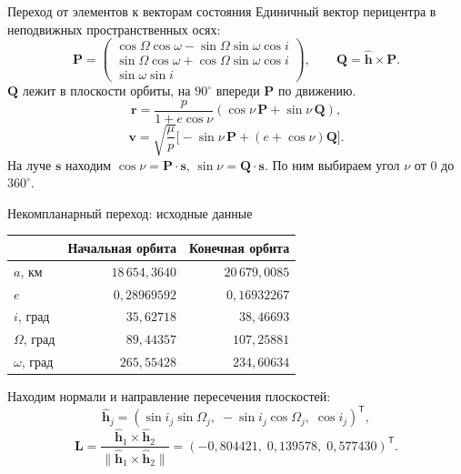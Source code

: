 \documentclass[11pt,aspectratio=169,t]{beamer}
\begin{document}
\begin{frame}{Переход от элементов к векторам состояния}
Единичный вектор перицентра в неподвижных пространственных осях:
\[
\mathbf P=\begin{pmatrix}
\cos\Omega\cos\omega-\sin\Omega\sin\omega\cos i\\
\sin\Omega\cos\omega+\cos\Omega\sin\omega\cos i\\
\sin\omega\sin i
\end{pmatrix},\qquad
\mathbf Q=\widehat{\mathbf h}\times\mathbf P.
\]
$\mathbf Q$ лежит в плоскости орбиты, на $90^\circ$ впереди $\mathbf P$ по движению.
\[
\boxed{\mathbf r=\frac{p}{1+e\cos\nu}(\cos\nu\,\mathbf P+\sin\nu\,\mathbf Q),}
\]
\[
\boxed{\mathbf v=\sqrt{\frac\mu p}\bigl[-\sin\nu\,\mathbf P+(e+\cos\nu)\mathbf Q\bigr].}
\]
\justifying
На луче $\mathbf s$ находим $\cos\nu=\mathbf P\cdot\mathbf s$, $\sin\nu=\mathbf Q\cdot\mathbf s$. По ним выбираем угол $\nu$ от $0$ до $360^\circ$.
\end{frame}

\begin{frame}{Некомпланарный переход: исходные данные}
\centering
\renewcommand{\arraystretch}{1.05}
\begin{tabular}{@{}lrr@{}}
\toprule
 & Начальная орбита & Конечная орбита\\\midrule
$a$, км & $18\,654{,}3640$ & $20\,679{,}0085$\\
$e$ & $0{,}28969592$ & $0{,}16932267$\\
$i$, град & $35{,}62718$ & $38{,}46693$\\
$\Omega$, град & $89{,}44357$ & $107{,}25881$\\
$\omega$, град & $265{,}55428$ & $234{,}60634$\\\bottomrule
\end{tabular}\par\smallskip
\raggedright
Находим нормали и направление пересечения плоскостей:
\[
\widehat{\mathbf h}_j=(\sin i_j\sin\Omega_j,\;-\sin i_j\cos\Omega_j,\;\cos i_j)^{\mathsf T},
\]
\[
\mathbf L=\frac{\widehat{\mathbf h}_1\times\widehat{\mathbf h}_2}
{\|\widehat{\mathbf h}_1\times\widehat{\mathbf h}_2\|}
=(-0{,}804421,\;0{,}139578,\;0{,}577430)^{\mathsf T}.
\]

\end{frame}
\end{document}

